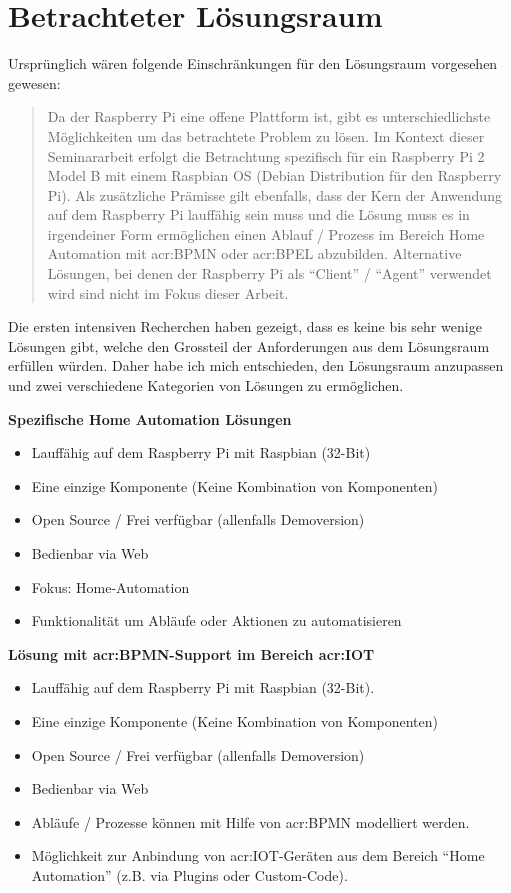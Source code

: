 \section{Betrachteter Lösungsraum}
Ursprünglich wären folgende Einschränkungen für den Lösungsraum vorgesehen gewesen:
\blockquote {Da der Raspberry Pi eine offene Plattform ist, gibt es unterschiedlichste Möglichkeiten um das betrachtete Problem zu lösen. Im Kontext dieser Seminararbeit erfolgt die Betrachtung spezifisch für ein Raspberry Pi 2 Model B mit einem Raspbian OS (Debian Distribution für den Raspberry Pi). Als zusätzliche Prämisse gilt ebenfalls, dass der Kern der Anwendung auf dem Raspberry Pi lauffähig sein muss und die Lösung muss es in irgendeiner Form ermöglichen einen Ablauf / Prozess im Bereich Home Automation mit \gls{acr:BPMN} oder \gls{acr:BPEL} abzubilden. Alternative Lösungen, bei denen der Raspberry Pi als "`Client"' / "`Agent"' verwendet wird sind nicht im Fokus dieser Arbeit.}

Die ersten intensiven Recherchen haben gezeigt, dass es keine bis sehr wenige Lösungen gibt, welche den Grossteil der Anforderungen aus dem Lösungsraum erfüllen würden. Daher habe ich mich entschieden, den Lösungsraum anzupassen und zwei verschiedene Kategorien von Lösungen zu ermöglichen.

\textbf{Spezifische Home Automation Lösungen}
\begin{itemize}
\item Lauffähig auf dem Raspberry Pi mit Raspbian (32-Bit)
\item Eine einzige Komponente (Keine Kombination von Komponenten)
\item Open Source / Frei verfügbar (allenfalls Demoversion)
\item Bedienbar via Web
\item Fokus: Home-Automation
\item Funktionalität um Abläufe oder Aktionen zu automatisieren
\end{itemize}

\textbf{Lösung mit \gls{acr:BPMN}-Support im Bereich \gls{acr:IOT}}
\begin{itemize}
\item Lauffähig auf dem Raspberry Pi mit Raspbian (32-Bit).
\item Eine einzige Komponente (Keine Kombination von Komponenten)
\item Open Source / Frei verfügbar (allenfalls Demoversion)
\item Bedienbar via Web
\item Abläufe / Prozesse können mit Hilfe von \gls{acr:BPMN} modelliert werden.
\item Möglichkeit zur Anbindung von \gls{acr:IOT}-Geräten aus dem Bereich "`Home Automation"' (z.B. via Plugins oder Custom-Code).
\end{itemize}



